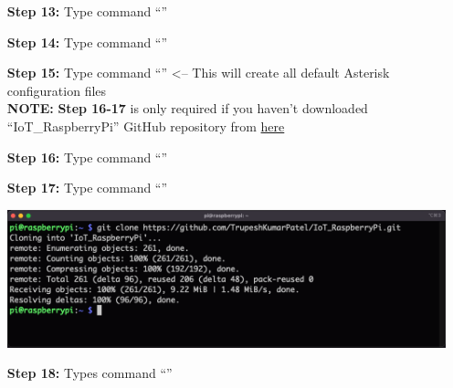\begin{itemize}[leftmargin=1.7cm]
			\item[\textbf{Step 13:}] Type command ``{\selectfont{sudo make}}''
			\item[\textbf{Step 14:}] Type command ``{\selectfont{sudo make install}}''
			\item[\textbf{Step 15:}] Type command ``{\selectfont{sudo make samples}}'' <-- This will create all default Asterisk configuration files\\
			\danger\textbf{NOTE:} \textbf{Step 16-17} is only required if you haven't downloaded ``IoT\_RaspberryPi'' GitHub repository from \href{https://github.com/TrupeshKumarPatel/IoT_RaspberryPi}{here}  \danger\\
			\item[\textbf{Step 16:}] \danger Type command ``{\selectfont{cd ~}}''
			\item[\textbf{Step 17:}] \danger Type command ``{\selectfont{git clone https://githu\\b.com/TrupeshKumarPatel/IoT\_RaspberryPi\\.git}}''\\
				\begin{minipage}{\textwidth}
					\vspace{2mm}
					\includegraphics[scale=0.177]{Images/raspberry_pi/eduroam_config/clone_git.png}
					\vspace{2mm}
				\end{minipage}
			\item[\textbf{Step 18:}] Types command ``{\selectfont{sudo cp -R ~/IoT\_Rasp\\berryPi/source\_code/asterisk\_config/* /etc/asterisk/}}''
		\end{itemize}

